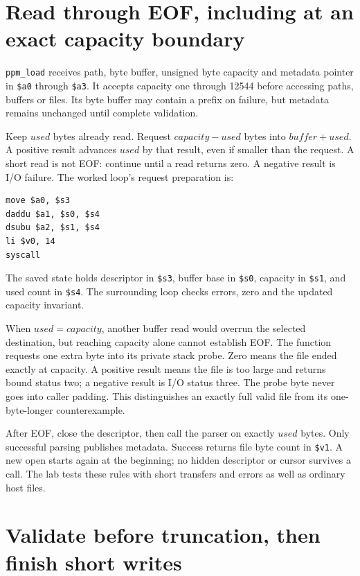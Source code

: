 \section{Read through EOF, including at an exact capacity boundary}

\texttt{ppm\_load} receives path, byte buffer, unsigned byte capacity and metadata
pointer in \texttt{\$a0} through \texttt{\$a3}. It accepts capacity one through
12544 before accessing paths, buffers or files. Its byte buffer may contain a
prefix on failure, but metadata remains unchanged until complete validation.

Keep $used$ bytes already read. Request $capacity-used$ bytes into
$buffer+used$. A positive result advances $used$ by that result, even if smaller
than the request. A short read is not EOF: continue until a read returns zero.
A negative result is I/O failure. The worked loop's request preparation is:
\begin{verbatim}
move $a0, $s3
daddu $a1, $s0, $s4
dsubu $a2, $s1, $s4
li $v0, 14
syscall
\end{verbatim}
The saved state holds descriptor in \texttt{\$s3}, buffer base in
\texttt{\$s0}, capacity in \texttt{\$s1}, and used count in \texttt{\$s4}.
The surrounding loop checks errors, zero and the updated capacity invariant.

When $used=capacity$, another buffer read would overrun the selected destination,
but reaching capacity alone cannot establish EOF. The function requests one
extra byte into its private stack probe. Zero means the file ended exactly at
capacity. A positive result means the file is too large and returns bound status
two; a negative result is I/O status three. The probe byte never goes into caller
padding. This distinguishes an exactly full valid file from its one-byte-longer
counterexample.

After EOF, close the descriptor, then call the parser on exactly $used$ bytes.
Only successful parsing publishes metadata. Success returns file byte count in
\texttt{\$v1}. A new open starts again at the beginning; no hidden descriptor or
cursor survives a call. The lab tests these rules with short transfers and errors
as well as ordinary host files.

\section{Validate before truncation, then finish short writes}

